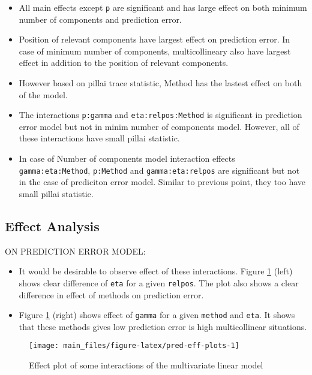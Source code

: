 \documentclass[12pt,3p,authoryear]{elsarticle}
\providecommand{\tightlist}{%
  \setlength{\itemsep}{0pt}\setlength{\parskip}{0pt}}
\begin{document}
\begin{itemize}
\tightlist
\item
  All main effects except \texttt{p} are significant and has large
  effect on both minimum number of components and prediction error.
\item
  Position of relevant components have largest effect on prediction
  error. In case of minimum number of components, multicollineary also
  have largest effect in addition to the position of relevant
  components.
\item
  However based on pillai trace statistic, Method has the lastest effect
  on both of the model.
\item
  The interactions \texttt{p:gamma} and \texttt{eta:relpos:Method} is
  significant in prediction error model but not in minim number of
  components model. However, all of these interactions have small pillai
  statistic.
\item
  In case of Number of components model interaction effects
  \texttt{gamma:eta:Method}, \texttt{p:Method} and
  \texttt{gamma:eta:relpos} are significant but not in the case of
  prediciton error model. Similar to previous point, they too have small
  pillai statistic.
\end{itemize}

\hypertarget{effect-analysis}{%
\subsection{Effect Analysis}\label{effect-analysis}}

ON PREDICTION ERROR MODEL:

\begin{itemize}
\tightlist
\item
  It would be desirable to observe effect of these interactions. Figure
  \ref{fig:pred-eff-plots} (left) shows clear difference of \texttt{eta}
  for a given \texttt{relpos}. The plot also shows a clear difference in
  effect of methods on prediction error.
\item
  Figure \ref{fig:pred-eff-plots} (right) shows effect of \texttt{gamma}
  for a given \texttt{method} and \texttt{eta}. It shows that these
  methods gives low prediction error is high multicollinear situations.
\end{itemize}

\begin{figure}
\texttt{[image: main\_files/figure-latex/pred-eff-plots-1]} \caption{Effect plot of some interactions of the multivariate linear model}\label{fig:pred-eff-plots}
\end{figure}
\end{document}

